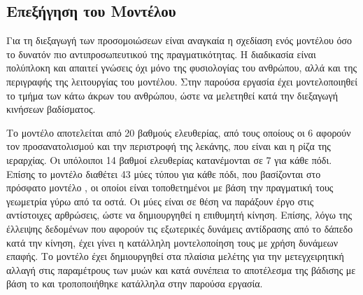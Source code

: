 %

\subsection{Επεξήγηση του Μοντέλου}

Για τη διεξαγωγή των προσομοιώσεων είναι αναγκαία η σχεδίαση ενός μοντέλου όσο το δυνατόν πιο αντιπροσωπευτικού της πραγματικότητας. Η διαδικασία είναι πολύπλοκη και απαιτεί γνώσεις όχι μόνο της φυσιολογίας του ανθρώπου, αλλά και της περιγραφής της λειτουργίας του μοντέλου. Στην παρούσα εργασία έχει μοντελοποιηθεί το τμήμα των κάτω άκρων του ανθρώπου, ώστε να μελετηθεί κατά την διεξαγωγή κινήσεων βαδίσματος.

Το μοντέλο αποτελείται από 20 βαθμούς ελευθερίας, από τους οποίους οι 6 αφορούν τον προσανατολισμού και την περιστροφή της λεκάνης, που είναι και η ρίζα της ιεραρχίας. Οι υπόλοιποι 14 βαθμοί ελευθερίας κατανέμονται σε 7 για κάθε πόδι. Επίσης το μοντέλο διαθέτει 43 μύες τύπου  για κάθε πόδι, που βασίζονται στο πρόσφατο μοντέλο , οι οποίοι είναι τοποθετημένοι με βάση την πραγματική τους γεωμετρία γύρω από τα οστά. Οι μύες είναι σε θέση να παράξουν έργο στις αντίστοιχες αρθρώσεις, ώστε να δημιουργηθεί η επιθυμητή κίνηση. Επίσης, λόγω της έλλειψης δεδομένων που αφορούν τις εξωτερικές δυνάμεις αντίδρασης από το δάπεδο κατά την κίνηση, έχει γίνει η κατάλληλη μοντελοποίηση τους με χρήση δυνάμεων επαφής. Το μοντέλο έχει δημιουργηθεί στα πλαίσια μελέτης για την μετεγχειρητική αλλαγή στις παραμέτρους των μυών και κατά συνέπεια το αποτέλεσμα της βάδισης με βάση το \cite{delp90} και τροποποιήθηκε κατάλληλα στην παρούσα εργασία.

